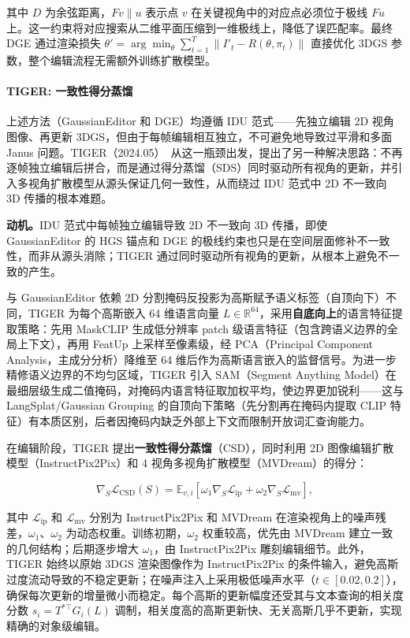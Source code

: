 其中 $D$ 为余弦距离，$Fv \parallel u$ 表示点 $v$ 在关键视角中的对应点必须位于极线 $Fu$ 上。这一约束将对应搜索从二维平面压缩到一维极线上，降低了误匹配率。最终 DGE 通过渲染损失 $\theta' = \arg\min_\theta \sum_{t=1}^{T} \| I'_t - R(\theta, \pi_t) \|$ 直接优化 3DGS 参数，整个编辑流程无需额外训练扩散模型。

\paragraph{TIGER: 一致性得分蒸馏}

上述方法（GaussianEditor 和 DGE）均遵循 IDU 范式——先独立编辑 2D 视角图像、再更新 3DGS，但由于每帧编辑相互独立，不可避免地导致过平滑和多面 Janus 问题。TIGER（2024.05）~\cite{2405_14455}从这一瓶颈出发，提出了另一种解决思路：不再逐帧独立编辑后拼合，而是通过得分蒸馏（SDS）同时驱动所有视角的更新，并引入多视角扩散模型从源头保证几何一致性，从而绕过 IDU 范式中 2D 不一致向 3D 传播的根本难题。

\textbf{动机。}IDU 范式中每帧独立编辑导致 2D 不一致向 3D 传播，即使 GaussianEditor 的 HGS 锚点和 DGE 的极线约束也只是在空间层面修补不一致性，而非从源头消除；TIGER 通过同时驱动所有视角的更新，从根本上避免不一致的产生。

与 GaussianEditor 依赖 2D 分割掩码反投影为高斯赋予语义标签（自顶向下）不同，TIGER 为每个高斯嵌入 64 维语言向量 $L \in \mathbb{R}^{64}$，采用\textbf{自底向上}的语言特征提取策略：先用 MaskCLIP 生成低分辨率 patch 级语言特征（包含跨语义边界的全局上下文），再用 FeatUp 上采样至像素级，经 PCA（Principal Component Analysis，主成分分析）降维至 64 维后作为高斯语言嵌入的监督信号。为进一步精修语义边界的不均匀区域，TIGER 引入 SAM（Segment Anything Model）在最细层级生成二值掩码，对掩码内语言特征取加权平均，使边界更加锐利——这与 LangSplat/Gaussian Grouping 的自顶向下策略（先分割再在掩码内提取 CLIP 特征）有本质区别，后者因掩码内缺乏外部上下文而限制开放词汇查询能力。

在编辑阶段，TIGER 提出\textbf{一致性得分蒸馏}（CSD），同时利用 2D 图像编辑扩散模型（InstructPix2Pix）和 4 视角多视角扩散模型（MVDream）的得分：

\begin{equation}
  \nabla_S \mathcal{L}_{\text{CSD}}(S) = \mathbb{E}_{v, i} \left[ \omega_1 \nabla_S \mathcal{L}_{\text{ip}} + \omega_2 \nabla_S \mathcal{L}_{\text{mv}} \right],
\end{equation}

其中 $\mathcal{L}_{\text{ip}}$ 和 $\mathcal{L}_{\text{mv}}$ 分别为 InstructPix2Pix 和 MVDream 在渲染视角上的噪声残差，$\omega_1$、$\omega_2$ 为动态权重。训练初期，$\omega_2$ 权重较高，优先由 MVDream 建立一致的几何结构；后期逐步增大 $\omega_1$，由 InstructPix2Pix 雕刻编辑细节。此外，TIGER 始终以原始 3DGS 渲染图像作为 InstructPix2Pix 的条件输入，避免高斯过度流动导致的不稳定更新；在噪声注入上采用极低噪声水平（$t \in [0.02, 0.2]$），确保每次更新的增量微小而稳定。每个高斯的更新幅度还受其与文本查询的相关度分数 $s_i = T^{*\top} G_i(L)$ 调制，相关度高的高斯更新快、无关高斯几乎不更新，实现精确的对象级编辑。

